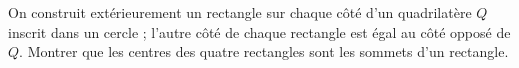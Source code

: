 On construit extérieurement un rectangle sur chaque côté d'un quadrilatère $Q$ inscrit dans un cercle ; l'autre côté de chaque rectangle est égal au côté opposé de $Q$. Montrer que les centres des quatre rectangles sont les sommets d'un rectangle.
